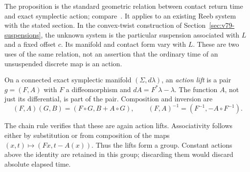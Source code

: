 The proposition is the standard geometric relation between contact
return time and exact symplectic action; compare~\cite{Hutchings2016}.
It applies to an existing Reeb system with the stated section.  In the
convex-twist construction of Section~\ref{sec:v79-suspensions}, the
unknown system is the particular suspension associated with $L$ and a
fixed offset $c$.  Its manifold and contact form vary with $L$.  These
are two uses of the same relation, not an assertion that the ordinary
time of an unsuspended discrete map is an action.

\begin{definition}
On a connected exact symplectic manifold $(\Sigma,d\lambda)$, an
\emph{action lift} is a pair $g=(F,A)$ with $F$ a diffeomorphism and
$dA=F^*\lambda-\lambda$.  The function $A$, not just its differential,
is part of the pair.  Composition and inversion are
\begin{equation}\label{eq:v80-lift-group}
 (F,A)(G,B)=(F\circ G,B+A\circ G),\qquad
 (F,A)^{-1}=(F^{-1},-A\circ F^{-1}).
\end{equation}
\end{definition}

The chain rule verifies that these are again action lifts.  Associativity
follows either by substitution or from composition of the maps
$(x,t)\mapsto(Fx,t-A(x))$.  Thus the lifts form a group.  Constant
actions above the identity are retained in this group; discarding them
would discard absolute elapsed time.

